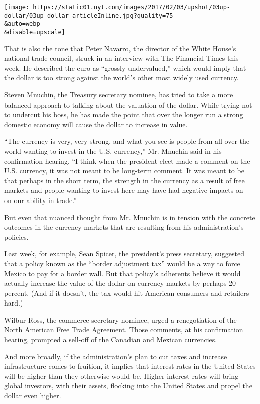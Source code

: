 \texttt{[image: https://static01.nyt.com/images/2017/02/03/upshot/03up-dollar/03up-dollar-articleInline.jpg?quality=75\\\&auto=webp\\\&disable=upscale]}

That is also the tone that Peter Navarro, the director of the White
House's national trade council, struck in an interview with The
Financial Times this week. He described the euro as ``grossly
undervalued,'' which would imply that the dollar is too strong against
the world's other most widely used currency.

Steven Mnuchin, the Treasury secretary nominee, has tried to take a more
balanced approach to talking about the valuation of the dollar. While
trying not to undercut his boss, he has made the point that over the
longer run a strong domestic economy will cause the dollar to increase
in value.

``The currency is very, very strong, and what you see is people from all
over the world wanting to invest in the U.S. currency,'' Mr. Mnuchin
said in his confirmation hearing. ``I think when the president-elect
made a comment on the U.S. currency, it was not meant to be long-term
comment. It was meant to be that perhaps in the short term, the strength
in the currency as a result of free markets and people wanting to invest
here may have had negative impacts on --- on our ability in trade.''

But even that nuanced thought from Mr. Mnuchin is in tension with the
concrete outcomes in the currency markets that are resulting from his
administration's policies.

Last week, for example, Sean Spicer, the president's press secretary,
\href{https://www.nytimes.com/2017/01/26/upshot/how-to-interpret-the-trump-administrations-latest-signals-on-mexico.html}{suggested}
that a policy known as the ``border adjustment tax'' would be a way to
force Mexico to pay for a border wall. But that policy's adherents
believe it would actually increase the value of the dollar on currency
markets by perhaps 20 percent. (And if it doesn't, the tax would hit
American consumers and retailers hard.)

Wilbur Ross, the commerce secretary nominee, urged a renegotiation of
the North American Free Trade Agreement. Those comments, at his
confirmation hearing,
\href{http://www.businessinsider.com/canadian-dollar-mexican-peso-wilbur-ross-nafta-2017-1}{prompted
a sell-off} of the Canadian and Mexican currencies.

And more broadly, if the administration's plan to cut taxes and increase
infrastructure comes to fruition, it implies that interest rates in the
United States will be higher than they otherwise would be. Higher
interest rates will bring global investors, with their assets, flocking
into the United States and propel the dollar even higher.

